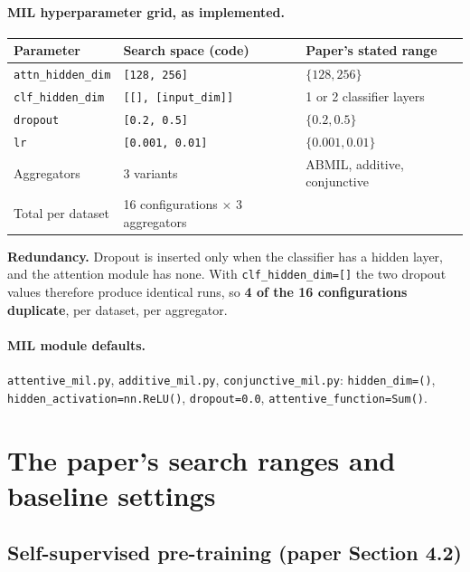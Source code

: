 \documentclass[10pt,a4paper]{article}
\begin{document}
\paragraph{MIL hyperparameter grid, as implemented.}

\begin{longtable}{@{}p{4.6cm}p{5.0cm}p{6.0cm}@{}}
\toprule
\textbf{Parameter} & \textbf{Search space (code)} & \textbf{Paper's stated range} \\
\midrule \endhead
\texttt{attn\_hidden\_dim} & \texttt{[128, 256]} & $\{128, 256\}$ \\
\texttt{clf\_hidden\_dim} & \texttt{[[], [input\_dim]]} & 1 or 2 classifier layers \\
\texttt{dropout} & \texttt{[0.2, 0.5]} & $\{0.2, 0.5\}$ \\
\texttt{lr} & \texttt{[0.001, 0.01]} & $\{0.001, 0.01\}$ \\
Aggregators & 3 variants & ABMIL, additive, conjunctive \\
Total per dataset & 16 configurations $\times$ 3 aggregators & \\
\bottomrule
\end{longtable}

\noindent\textbf{Redundancy.} Dropout is inserted only when the classifier has a
hidden layer, and the attention module has none. With \texttt{clf\_hidden\_dim=[]}
the two dropout values therefore produce identical runs, so \textbf{4 of the 16
configurations duplicate}, per dataset, per aggregator.

\paragraph{MIL module defaults.} \texttt{attentive\_mil.py}, \texttt{additive\_mil.py},
\texttt{conjunctive\_mil.py}:
\texttt{hidden\_dim=()}, \texttt{hidden\_activation=nn.ReLU()}, \texttt{dropout=0.0},
\texttt{attentive\_function=Sum()}.

\newpage
\section{The paper's search ranges and baseline settings}

\subsection{Self-supervised pre-training (paper Section 4.2)}
\end{document}
